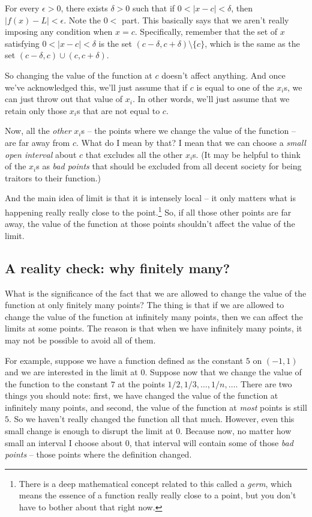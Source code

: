 \documentclass[10pt]{amsart}
\begin{document}
For every $\epsilon > 0$, there exists $\delta > 0$ such that if $0 <
|x - c| < \delta$, then $|f(x) - L| < \epsilon$. Note the $0 <$
part. This basically says that we aren't really imposing any condition
when $x = c$. Specifically, remember that the set of $x$ satisfying $0
< |x - c| < \delta$ is the set $(c - \delta,c + \delta) \setminus \{ c
\}$, which is the same as the set $(c - \delta,c) \cup (c, c +
\delta)$.

So changing the value of the function at $c$ doesn't affect
anything. And once we've acknowledged this, we'll just assume that if
$c$ is equal to one of the $x_i$s, we can just throw out that value of
$x_i$. In other words, we'll just assume that we retain only those
$x_i$s that are not equal to $c$.

Now, all the {\em other} $x_i$s -- the points where we change the
value of the function -- are far away from $c$. What do I mean by
that? I mean that we can choose a {\em small open interval} about $c$
that excludes all the other $x_i$s. (It may be helpful to think of the
$x_i$s as {\em bad points} that should be excluded from all decent
society for being traitors to their function.)

And the main idea of limit is that it is intensely local -- it only
matters what is happening really really close to the
point.\footnote{There is a deep mathematical concept related to this
called a {\em germ}, which means the essence of a function really
really close to a point, but you don't have to bother about that right
now.} So, if all those other points are far away, the value of the
function at those points shouldn't affect the value of the limit.

\subsection{A reality check: why finitely many?}

What is the significance of the fact that we are allowed to change the
value of the function at only finitely many points? The thing is that
if we are allowed to change the value of the function at infinitely
many points, then we can affect the limits at some points. The reason
is that when we have infinitely many points, it may not be possible to
avoid all of them.

For example, suppose we have a function defined as the constant $5$ on
$(-1,1)$ and we are interested in the limit at $0$. Suppose now that
we change the value of the function to the constant $7$ at the points
$1/2, 1/3, \dots, 1/n, \dots$. There are two things you should note:
first, we have changed the value of the function at infinitely many
points, and second, the value of the function at {\em most} points is
still $5$. So we haven't really changed the function all that
much. However, even this small change is enough to disrupt the limit
at $0$. Because now, no matter how small an interval I choose about
$0$, that interval will contain some of those {\em bad points} --
those points where the definition changed.
\end{document}
